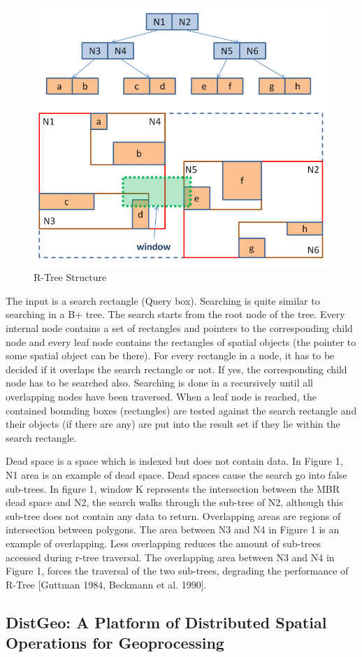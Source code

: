 \begin{figure}[ht]
\centering
\includegraphics[width=.5\textwidth]{r-tree-structure.png}
\caption{R-Tree Structure}
\label{fig:R-Tree Structure}
\end{figure}

The input is a search rectangle (Query box). Searching is quite similar to searching in a B+ tree. The search starts from the root node of the tree. Every internal node contains a set of rectangles and pointers to the corresponding child node and every leaf node contains the rectangles of spatial objects (the pointer to some spatial object can be there). For every rectangle in a node, it has to be decided if it overlaps the search rectangle or not. If yes, the corresponding child node has to be searched also. Searching is done in a recursively until all overlapping nodes have been traversed. When a leaf node is reached, the contained bounding boxes (rectangles) are tested against the search rectangle and their objects (if there are any) are put into the result set if they lie within the search rectangle.
	
	Dead space is a space which is indexed but does not contain data. In Figure 1, N1 area is an example of dead space. Dead spaces cause the search go into false sub-trees. In figure 1, window K represents the intersection between the MBR dead space and N2, the search walks through the sub-tree of N2, although this sub-tree does not contain any data to return.
Overlapping areas are regions of intersection between polygons. The area between N3 and N4 in Figure 1 is an example of overlapping. Less overlapping reduces the amount of sub-trees accessed during r-tree traversal. The overlapping area between N3 and N4 in Figure 1, forces the traversal of the two sub-trees, degrading the performance of R-Tree [Guttman 1984, Beckmann et al. 1990].

\subsection{DistGeo: A Platform of Distributed Spatial Operations for Geoprocessing}

